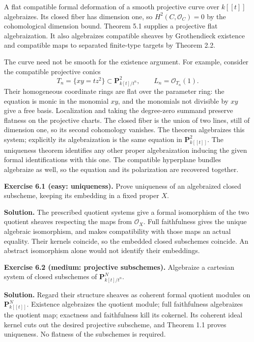 \documentclass[11pt]{article}
\begin{document}
A flat compatible formal deformation of a smooth projective curve over
\(k[[t]]\) algebraizes. Its closed fiber has dimension one, so
\(H^2(C,\mathcal O_C)=0\) by the cohomological dimension bound. Theorem
5.1 supplies a projective flat algebraization. It also algebraizes
compatible sheaves by Grothendieck existence and compatible maps to
separated finite-type targets by Theorem 2.2.

The curve need not be smooth for the existence argument. For example,
consider the compatible projective conics \[
T_n=\{xy=t z^2\}\subset\mathbf P^2_{k[t]/t^n},
\qquad L_n=\mathcal O_{T_n}(1).
\] Their homogeneous coordinate rings are flat over the parameter ring:
the equation is monic in the monomial \(xy\), and the monomials not
divisible by \(xy\) give a free basis. Localization and taking the
degree-zero summand preserve flatness on the projective charts. The
closed fiber is the union of two lines, still of dimension one, so its
second cohomology vanishes. The theorem algebraizes this system;
explicitly its algebraization is the same equation in
\(\mathbf P^2_{k[[t]]}\). The uniqueness theorem identifies any other
proper algebraization inducing the given formal identifications with
this one. The compatible hyperplane bundles algebraize as well, so the
equation and its polarization are recovered together.

\textbf{Exercise 6.1 (easy: uniqueness).} Prove uniqueness of an
algebraized closed subscheme, keeping its embedding in a fixed proper
\(X\).

\textbf{Solution.} The prescribed quotient systems give a formal
isomorphism of the two quotient sheaves respecting the maps from
\(\mathcal O_X\). Full faithfulness gives the unique algebraic
isomorphism, and makes compatibility with those maps an actual equality.
Their kernels coincide, so the embedded closed subschemes coincide. An
abstract isomorphism alone would not identify their embeddings.

\textbf{Exercise 6.2 (medium: projective subschemes).} Algebraize a
cartesian system of closed subschemes of \(\mathbf P^N_{k[t]/t^n}\).

\textbf{Solution.} Regard their structure sheaves as coherent formal
quotient modules on \(\mathbf P^N_{k[[t]]}\). Existence algebraizes the
quotient module; full faithfulness algebraizes the quotient map;
exactness and faithfulness kill its cokernel. Its coherent ideal kernel
cuts out the desired projective subscheme, and Theorem 1.1 proves
uniqueness. No flatness of the subschemes is required.
\end{document}
